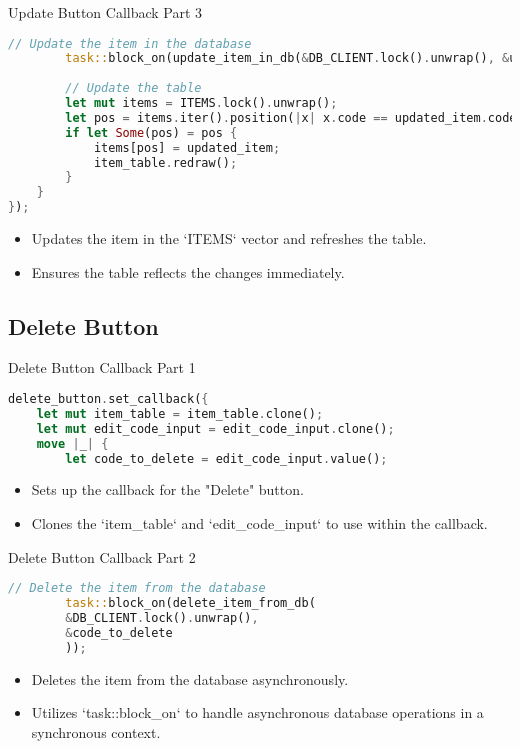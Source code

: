 \documentclass[aspectratio=169, table]{beamer}
\begin{document}
\begin{frame}[fragile]{Update Button Callback Part 3}
	\vspace{15pt}
	\begin{lstlisting}[language=Rust]
		// Update the item in the database
		task::block_on(update_item_in_db(&DB_CLIENT.lock().unwrap(), &updated_item));
		
		// Update the table
		let mut items = ITEMS.lock().unwrap();
		let pos = items.iter().position(|x| x.code == updated_item.code);
		if let Some(pos) = pos {
			items[pos] = updated_item;
			item_table.redraw();
		}
	}
});
\end{lstlisting}
\begin{itemize}
\item Updates the item in the `ITEMS` vector and refreshes the table.
\item Ensures the table reflects the changes immediately.
\end{itemize}
\end{frame}

\subsection{Delete Button}
\begin{frame}[fragile]{Delete Button Callback Part 1}
\begin{lstlisting}[language=Rust]
delete_button.set_callback({
	let mut item_table = item_table.clone();
	let mut edit_code_input = edit_code_input.clone();
	move |_| {
		let code_to_delete = edit_code_input.value();
	\end{lstlisting}
	
	\begin{itemize}
		\item Sets up the callback for the "Delete" button.
		\item Clones the `item\_table` and `edit\_code\_input` to use within the callback.
	\end{itemize}
\end{frame}

\begin{frame}[fragile]{Delete Button Callback Part 2}
	\begin{lstlisting}[language=Rust]
		// Delete the item from the database
		task::block_on(delete_item_from_db(
		&DB_CLIENT.lock().unwrap(),
		&code_to_delete
		));
	\end{lstlisting}
	
	\begin{itemize}
		\item Deletes the item from the database asynchronously.
		\item Utilizes `task::block\_on` to handle asynchronous database operations in a synchronous context.
	\end{itemize}
\end{frame}
\end{document}
